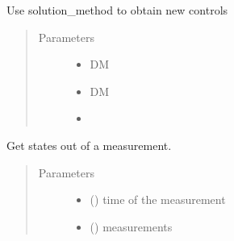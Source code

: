 \documentclass[letterpaper,10pt,english]{sphinxmanual}
\begin{document}
\begin{fulllineitems}
\begin{fulllineitems}
\begin{quote}
\begin{description}
\end{description}\end{quote}

\end{fulllineitems}


\begin{fulllineitems}
\label{\detokenize{yaocptool.mpc:yaocptool.mpc.mpc.MPC.get_new_control}}
Use solution\_method to obtain new controls
\begin{quote}\begin{description}
\item[{Parameters}] \leavevmode\begin{itemize}
\item {} 
 \textendash{} DM

\item {} 
 \textendash{} DM

\item {} 
 \textendash{} 

\end{itemize}

\end{description}\end{quote}

\end{fulllineitems}


\begin{fulllineitems}
\label{\detokenize{yaocptool.mpc:yaocptool.mpc.mpc.MPC.get_states}}
Get states out of a measurement.
\begin{quote}\begin{description}
\item[{Parameters}] \leavevmode\begin{itemize}
\item {} 
 () \textendash{} time of the measurement

\item {} 
 () \textendash{} measurements


\end{itemize}
\end{description}
\end{quote}
\end{fulllineitems}
\end{fulllineitems}
\end{document}
